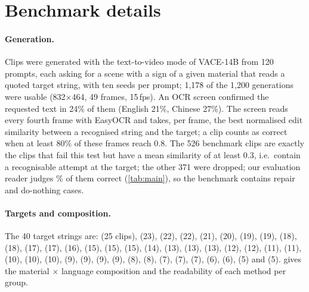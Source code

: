 \clearpage
\setcounter{page}{1}
\maketitlesupplementary
\appendix

\section{Benchmark details}
\label{sec:supp_bench}

\paragraph{Generation.} Clips were generated with the text-to-video mode of VACE-14B from 120 prompts, each asking for a scene with a sign of a given material that reads a quoted target string, with ten seeds per prompt; 1{,}178 of the 1{,}200 generations were usable (832$\times$464, 49 frames, 15\,fps). An OCR screen confirmed the requested text in 24\% of them (English 21\%, Chinese 27\%). The screen reads every fourth frame with EasyOCR and takes, per frame, the best normalised edit similarity between a recognised string and the target; a clip counts as correct when at least 80\% of these frames reach 0.8. The 526 benchmark clips are exactly the clips that fail this test but have a mean similarity of at least 0.3, i.e.\ contain a recognisable attempt at the target; the other 371 were dropped; our evaluation reader judges \rOrigRead\% of them correct (\cref{tab:main}), so the benchmark contains repair and do-nothing cases.

\paragraph{Targets and composition.} The 40 target strings are:  (25 clips),  (23),  (22),  (22),  (21),  (20),  (19),  (19),  (18),  (18),  (17),  (17),  (16),  (15),  (15),  (15),  (14),  (13),  (13),  (13),  (12),  (12),  (11),  (11),  (10),  (10),  (10),  (9),  (9),  (9),  (9),  (8),  (8),  (7),  (7),  (7),  (6),  (6),  (5) and  (5).  gives the material $\times$ language composition and the readability of each method per group.

